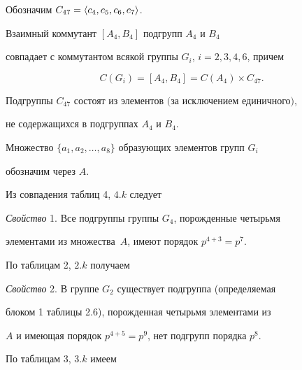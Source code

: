 Обозначим $C_{47}=\langle c_4,c_5,c_6,c_7\rangle$.








\begin{thm}


Взаимный коммутант $[A_4,B_4]$ подгрупп $A_4$ и $B_4$


совпадает с коммутантом всякой группы $G_i$, $i=2,3,4,6$, причем


$$


C(G_i)=[A_4,B_4]=C(A_4)\times C_{47}.


$$


Подгруппы $C_{47}$ состоят из элементов $($за исключением единичного$)$,


не содержащихся в подгруппах $A_4$ и $B_4$.


\end{thm}





Множество $\{a_1,a_2,\dotsc,a_8\}$ образующих элементов групп $G_i$


обозначим через $A$.





Из совпадения таблиц 4, $4.k$ следует


\medskip





{\it Свойство} 1. Все подгруппы группы $G_4$, порожденные четырьмя 


элементами из множества~$A$, имеют порядок $p^{4+3}=p^7$.


\medskip





По таблицам 2, $2.k$ получаем


\medskip





{\it Свойство} 2. В группе $G_2$ существует подгруппа (определяемая 


блоком 1 таблицы 2.6), порожденная четырьмя элементами из


$A$ и имеющая порядок $p^{4+5}=p^9$, нет подгрупп порядка $p^8$.


\medskip





По таблицам 3, $3.k$ имеем


\medskip





